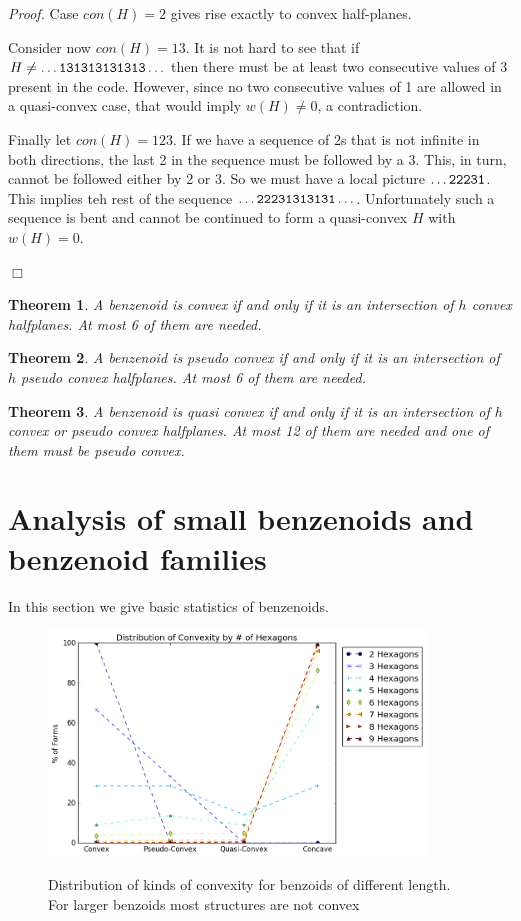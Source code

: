\documentclass[a4paper,10pt]{article}
\newcounter{theorem}
\newtheorem{theorem}{Theorem}[section]
\newenvironment{proof}{\medskip\emph{Proof.}}{\hfill$\Box$\medskip}
\begin{document}
{\begin{proof}
Case $con(H) = 2$ gives rise exactly to convex half-planes.

Consider now $con(H) = 13$. It is not hard to see that if $H \neq {\tt \ldots 131313131313 \ldots}$ then there must be at least two consecutive values of 3 present in the code. However, since no two consecutive values of 1 are allowed in a quasi-convex case, that would imply $w(H) \neq 0$, a contradiction.

Finally let $con(H) = 123$. If we have a sequence of 2s that is not infinite in both directions, the last 2 in the sequence must be followed by a 3. This, in turn, cannot be followed either by 2 or 3. So we must have a local picture ${\tt \ldots 22231}$. This implies teh rest of the sequence 
${\tt \ldots 22231313131 \ldots}$. Unfortunately such a sequence is bent
and cannot be continued to form a quasi-convex $H$ with $w(H) = 0$.

 
\end{proof}



\begin{theorem}
A benzenoid is convex if and only if it is an intersection of $h$ convex halfplanes. At most 6 of them
are needed.
\end{theorem}

\begin{theorem}
A benzenoid is pseudo convex if and only if it is an intersection of $h$ pseudo convex halfplanes. At most 6 of them are needed.
\end{theorem}

\begin{theorem}
A benzenoid is quasi convex if and only if it is an intersection of $h$ convex or pseudo convex halfplanes. 
At most 12 of them are needed and one of them must be pseudo convex.
\end{theorem}


\section{Analysis of small benzenoids and benzenoid families}

In this section we give basic statistics of benzenoids.


\begin{figure}
\centering
 \includegraphics[width=100mm]{figures/distribution_of_convexity.png}
 \label{fig_convex}
 \caption{Distribution of kinds of convexity for benzoids of different length. For larger benzoids most structures are not convex}
\end{figure}

}
\end{document}
